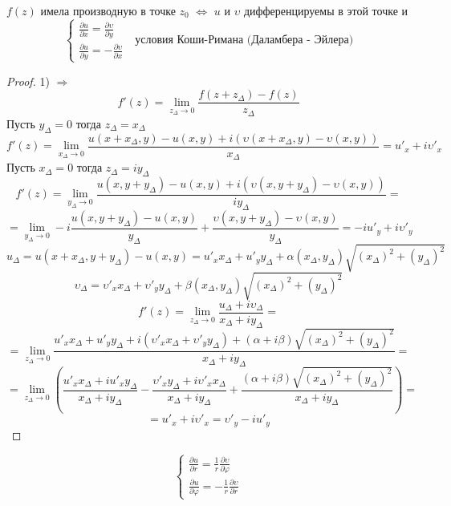 \begin{theorem}
  $f(z)$ имела производную в точке $z_0$ $\Leftrightarrow$ $u$ и $\upsilon$
  дифференцируемы в этой точке и
  $$
  \left\{
  \begin{array}{l}
    \frac{\partial u}{\partial x} = \frac{\partial \upsilon}{\partial y} \\
    \frac{\partial u}{\partial y} = -\frac{\partial \upsilon}{\partial x}
  \end{array}
  \right. ~~~ \text{условия Коши-Римана (Даламбера - Эйлера)}
  $$
\end{theorem}

\begin{proof}
  1) $\Rightarrow$
  $$
  f'(z) = \lim_{z_{\Delta} \to 0} \frac{f(z + z_{\Delta}) - f(z)}{z_{\Delta}}
  $$
  Пусть $y_{\Delta} = 0$ тогда $z_{\Delta} = x_{\Delta}$
  $$
  f'(z) = \lim_{x_{\Delta} \to 0} \frac{u(x + x_{\Delta}, y) - u(x,y) +
  i(\upsilon(x + x_{\Delta}, y) - \upsilon(x,y))}{x_{\Delta}} = u'_x +
  i\upsilon'_x
  $$
  Пусть $x_{\Delta} = 0$ тогда $z_{\Delta} = iy_{\Delta}$
  $$
  f'(z) = \lim_{y_{\Delta} \to 0} \frac{u(x, y + y_{\Delta}) - u(x,y) +
  i(\upsilon(x, y + y_{\Delta}) - \upsilon(x,y))}{iy_{\Delta}} =
  $$
  $$
  = \lim_{y_{\Delta} \to 0} -i\frac{u(x, y + y_{\Delta}) - u(x,y)}{y_{\Delta}} +
  \frac{\upsilon(x, y + y_{\Delta}) - \upsilon(x,y)}{y_{\Delta}} = -iu'_y +
  i\upsilon'_y
  $$
  $$
  u_{\Delta} = u(x + x_{\Delta}, y + y_{\Delta}) - u(x,y) =
  u'_x x_{\Delta} + u'_y y_{\Delta} + \alpha(x_{\Delta}, y_{\Delta})
  \sqrt{(x_{\Delta})^2 + (y_{\Delta})^2}
  $$
  $$
  \upsilon_{\Delta} = \upsilon'_x x_{\Delta} + \upsilon'_y y_{\Delta} +
  \beta(x_{\Delta}, y_{\Delta})\sqrt{(x_{\Delta})^2 + (y_{\Delta})^2}
  $$
  $$
  f'(z) = \lim_{z_{\Delta} \to 0} \frac{u_{\Delta} +
  i\upsilon_{\Delta}}{x_{\Delta} + iy_{\Delta}} =
  $$
  $$
  = \lim_{z_{\Delta} \to 0} \frac{u'_x x_{\Delta} + u'_y y_{\Delta} +
  i(\upsilon'_x x_{\Delta} + \upsilon'_y y_{\Delta}) + (\alpha + i\beta)
  \sqrt{(x_{\Delta})^2 + (y_{\Delta})^2} }{x_{\Delta} + iy_{\Delta}} =
  $$
  $$
  = \lim_{z_{\Delta} \to 0} \left( \frac{u'_x x_{\Delta} +
  iu'_x y_{\Delta}} {x_{\Delta} + iy_{\Delta}}
  -\frac{\upsilon'_x y_{\Delta} +
  i\upsilon'_x x_{\Delta}}{x_{\Delta} + iy_{\Delta}} + \frac{(\alpha + i\beta)
  \sqrt{(x_{\Delta})^2 + (y_{\Delta})^2} }{x_{\Delta} + iy_{\Delta}}\right) =
  $$
  $$
  = u'_x + i\upsilon'_x = \upsilon'_y - iu'_y
  $$
\end{proof}

\begin{theorem}
  $$
  \left\{
  \begin{array}{l}
    \frac{\partial u}{\partial r} = \frac{1}{r} \frac{\partial \upsilon}
    {\partial \varphi} \\
    \frac{\partial u}{\partial \varphi} = -\frac{1}{r} \frac{\partial \upsilon}
    {\partial r}
  \end{array}
  \right.
  $$
\end{theorem}

